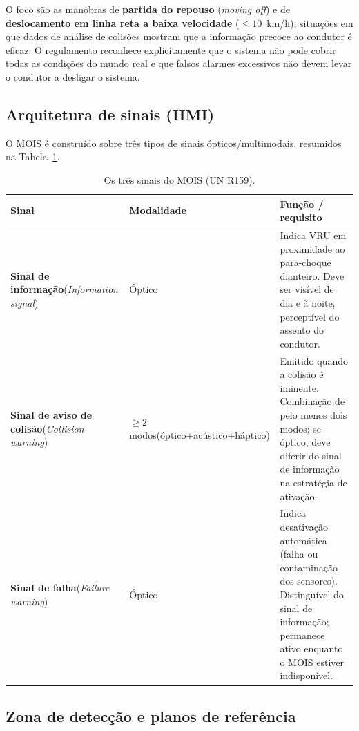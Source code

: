 \documentclass[11pt,a4paper]{article}
\begin{document}
O foco são as manobras de \textbf{partida do repouso} (\emph{moving off}) e de
\textbf{deslocamento em linha reta a baixa velocidade} ($\leq 10$~km/h),
situações em que dados de análise de colisões mostram que a informação precoce
ao condutor é eficaz. O regulamento reconhece explicitamente que o sistema não
pode cobrir todas as condições do mundo real e que falsos alarmes excessivos
não devem levar o condutor a desligar o sistema.

\subsection{Arquitetura de sinais (HMI)}

O MOIS é construído sobre três tipos de sinais ópticos/multimodais, resumidos
na Tabela~\ref{tab:sinais159}.

\begin{table}[H]
\centering
\caption{Os três sinais do MOIS (UN R159).}
\label{tab:sinais159}
\small
\begin{tabularx}{\linewidth}{@{}p{3.3cm}p{2.6cm}X@{}}
\toprule
\textbf{Sinal} & \textbf{Modalidade} & \textbf{Função / requisito} \\
\midrule
\textbf{Sinal de informação}\newline(\emph{Information signal}) & Óptico &
Indica VRU em proximidade ao para-choque dianteiro. Deve ser visível de dia e
à noite, perceptível do assento do condutor. \\
\addlinespace
\textbf{Sinal de aviso de colisão}\newline(\emph{Collision warning}) &
$\geq 2$ modos\newline(óptico+acústico\newline +háptico) &
Emitido quando a colisão é iminente. Combinação de pelo menos dois modos;
se óptico, deve diferir do sinal de informação na estratégia de ativação. \\
\addlinespace
\textbf{Sinal de falha}\newline(\emph{Failure warning}) & Óptico &
Indica desativação automática (falha ou contaminação dos sensores).
Distinguível do sinal de informação; permanece ativo enquanto o MOIS
estiver indisponível. \\
\bottomrule
\end{tabularx}
\end{table}

\subsection{Zona de detecção e planos de referência}
\end{document}
